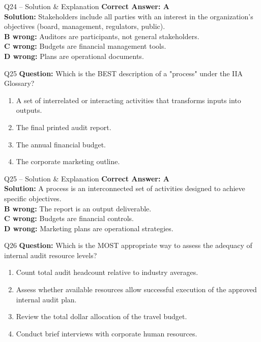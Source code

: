 \documentclass[aspectratio=169,10pt]{beamer}
\begin{document}
	\begin{frame}[t]{Q24 -- Solution \& Explanation}
		\small
		\textbf{Correct Answer: A} \\[4pt]
		\textbf{Solution:} Stakeholders include all parties with an interest in the organization's objectives (board, management, regulators, public). \\[4pt]
		\textbf{B wrong:} Auditors are participants, not general stakeholders. \\[2pt]
		\textbf{C wrong:} Budgets are financial management tools. \\[2pt]
		\textbf{D wrong:} Plans are operational documents.
	\end{frame}
	
	\begin{frame}[t]{Q25}
		\small
		\textbf{Question:} Which is the BEST description of a "process" under the IIA Glossary?
		\begin{enumerate}[label=\Alph*.,itemsep=1pt,topsep=2pt]
			\item A set of interrelated or interacting activities that transforms inputs into outputs.
			\item The final printed audit report.
			\item The annual financial budget.
			\item The corporate marketing outline.
		\end{enumerate}
	\end{frame}
	
	\begin{frame}[t]{Q25 -- Solution \& Explanation}
		\small
		\textbf{Correct Answer: A} \\[4pt]
		\textbf{Solution:} A process is an interconnected set of activities designed to achieve specific objectives. \\[4pt]
		\textbf{B wrong:} The report is an output deliverable. \\[2pt]
		\textbf{C wrong:} Budgets are financial controls. \\[2pt]
		\textbf{D wrong:} Marketing plans are operational strategies.
	\end{frame}
	
	\begin{frame}[t]{Q26}
		\small
		\textbf{Question:} Which is the MOST appropriate way to assess the adequacy of internal audit resource levels?
		\begin{enumerate}[label=\Alph*.,itemsep=1pt,topsep=2pt]
			\item Count total audit headcount relative to industry averages.
			\item Assess whether available resources allow successful execution of the approved internal audit plan.
			\item Review the total dollar allocation of the travel budget.
			\item Conduct brief interviews with corporate human resources.
		\end{enumerate}
	\end{frame}
	
\end{document}
